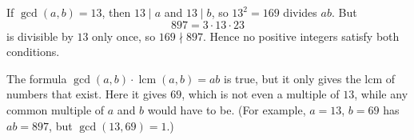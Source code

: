 If $\gcd(a,b)=13$, then $13\mid a$ and $13\mid b$, so $13^2=169$ divides $ab$. But
\[
897=3\cdot13\cdot23
\]
is divisible by $13$ only once, so $169\nmid897$. Hence no positive integers satisfy both conditions.

The formula $\gcd(a,b)\cdot\operatorname{lcm}(a,b)=ab$ is true, but it only gives the lcm of numbers that exist. Here it gives $69$, which is not even a multiple of $13$, while any common multiple of $a$ and $b$ would have to be. (For example, $a=13$, $b=69$ has $ab=897$, but $\gcd(13,69)=1$.)
